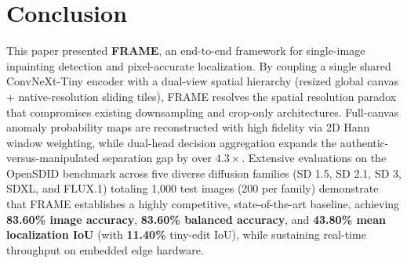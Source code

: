 \documentclass[sigconf,review=true]{acmart}
\begin{document}
\begin{table}[t]
\centering\small
\setlength{\tabcolsep}{4pt}
\caption{Empirical inference profiling on the FRAME development machine (NVIDIA GeForce RTX\,2070 SUPER, 8\,GB VRAM). Latency and FPS are averaged over 50 CUDA-timed iterations (PyTorch Event API) covering 1 global view + 4 native tiles per image. Parameter counts for competing baselines are from published papers; their VRAM estimates are from published hardware requirements.}
\label{tab:hardware_profile}
\end{table}

\section{Conclusion}
\label{sec:conclusion}
This paper presented \textbf{FRAME}, an end-to-end framework for single-image inpainting detection and pixel-accurate localization. By coupling a single shared ConvNeXt-Tiny encoder with a dual-view spatial hierarchy (resized global canvas + native-resolution sliding tiles), FRAME resolves the spatial resolution paradox that compromises existing downsampling and crop-only architectures. Full-canvas anomaly probability maps are reconstructed with high fidelity via 2D Hann window weighting, while dual-head decision aggregation expands the authentic-versus-manipulated separation gap by over $4.3\times$. Extensive evaluations on the OpenSDID benchmark across five diverse diffusion families (SD 1.5, SD 2.1, SD 3, SDXL, and FLUX.1) totaling 1,000 test images (200 per family) demonstrate that FRAME establishes a highly competitive, state-of-the-art baseline, achieving \textbf{83.60\% image accuracy}, \textbf{83.60\% balanced accuracy}, and \textbf{43.80\% mean localization IoU} (with \textbf{11.40\%} tiny-edit IoU), while sustaining real-time throughput on embedded edge hardware.



\end{document}
